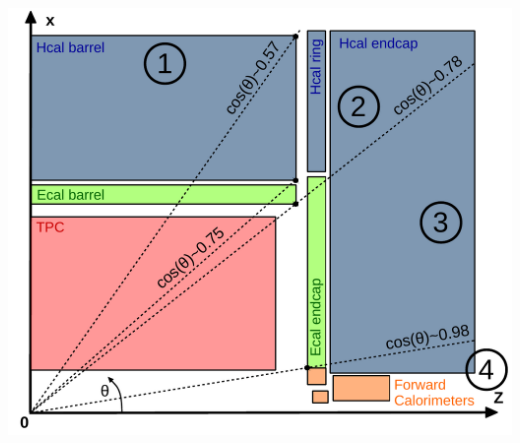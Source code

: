 \documentclass[8pt]{beamer}
\begin{document}
\begin{frame}
\begin{minipage}{0.43\linewidth}
\begin{center}
        \includegraphics[width=\linewidth]{BarrelEndcapRegions.pdf}
      \end{center}
    \end{minipage}
  \end{frame}
\end{document}

